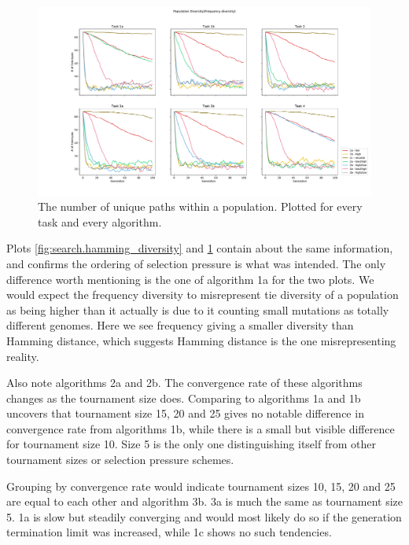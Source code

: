 \begin{figure}[p!]
    \includegraphics[width=1.2\textwidth,center]{Chapters/4.Experiments/exp2/figures/frequency_diversity_unique_path_count.pdf}
    \caption{The number of unique paths within a population. Plotted for every task and every algorithm.}
    \label{fig:search.frequency_diversity_unique}
\end{figure}

Plots \ref{fig:search.hamming_diversity} and \ref{fig:search.frequency_diversity_unique} contain about the same information, and confirms the ordering of selection pressure is what was intended. The only difference worth mentioning is the one of algorithm 1a for the two plots. We would expect the frequency diversity to misrepresent tie diversity of a population as being higher than it actually is due to it counting small mutations as totally different genomes. Here we see frequency giving a smaller diversity than Hamming distance, which suggests Hamming distance is the one misrepresenting reality. 

Also note algorithms 2a and 2b. The convergence rate of these algorithms changes as the tournament size does. Comparing to algorithms 1a and 1b uncovers that tournament size 15, 20 and 25 gives no notable difference in convergence rate from algorithms 1b, while there is a small but visible difference for tournament size 10. Size 5 is the only one distinguishing itself from other tournament sizes or selection pressure schemes. 

Grouping by convergence rate would indicate tournament sizes 10, 15, 20 and 25 are equal to each other and algorithm 3b. 3a is much the same as tournament size 5. 1a is slow but steadily converging and would most likely do so if the generation termination limit was increased, while 1c shows no such tendencies. 

